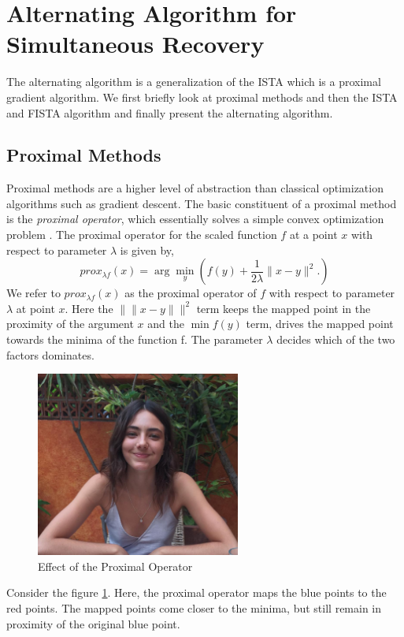 \section{Alternating Algorithm for Simultaneous Recovery}
The alternating algorithm is a generalization of the ISTA  which is a proximal gradient algorithm. We first  briefly look at proximal methods and then the ISTA and FISTA algorithm and finally present the alternating algorithm.
\subsection{Proximal Methods}
Proximal methods are a higher level of abstraction than classical optimization algorithms such as gradient descent. The basic constituent of a proximal method is the \emph{proximal operator}, which essentially solves a simple convex optimization problem \cite{prox_book}. The proximal operator for the scaled function $f$ at a point $x$ with respect to parameter $\lambda$ is given by,
\begin{equation}
prox_{\lambda f}(x) = \arg \min_y \left( f(y) + \frac{1}{2\lambda} \| x - y \|^2. \right)
\end{equation}
We refer to $prox_{\lambda f}(x)$ as the proximal operator of $f$ with respect to parameter $\lambda$ at point $x$.
Here the $\|\| x - y \|\|^2$ term keeps the mapped point in the proximity of the argument $x$ and the $\min f(y)$ term, drives the mapped point towards the minima of the function f. The parameter $\lambda$ decides which of the two factors dominates.


\begin{figure}[h]
	\centering \vspace{-0.1in}
	\includegraphics[width=0.6\textwidth]{images/proximal.png}	
	\vspace{-20pt} \caption[Effect of the proximal Operator]{\small Effect of the Proximal Operator \footnotemark}
	\label{fig:proximal_operator}
\end{figure}
Consider the figure \ref{fig:proximal_operator}. Here, the proximal operator maps the blue points to the red points.
The mapped points come closer to the minima, but still remain in proximity of the original blue point.

